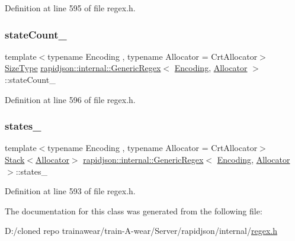 Definition at line 595 of file regex.\+h.

\mbox{\label{classrapidjson_1_1internal_1_1_generic_regex_a7155bb711773efe87437985ce9bd87e1}} 
\subsubsection{\texorpdfstring{stateCount\_}{stateCount\_}}
{\footnotesize\ttfamily template$<$typename Encoding , typename Allocator  = Crt\+Allocator$>$ \\
\mbox{\hyperlink{namespacerapidjson_a44eb33eaa523e36d466b1ced64b85c84}{Size\+Type}} \mbox{\hyperlink{classrapidjson_1_1internal_1_1_generic_regex}{rapidjson\+::internal\+::\+Generic\+Regex}}$<$ \mbox{\hyperlink{classrapidjson_1_1_encoding}{Encoding}}, \mbox{\hyperlink{classrapidjson_1_1_allocator}{Allocator}} $>$\+::state\+Count\+\_\+\hspace{0.3cm}{\ttfamily [private]}}



Definition at line 596 of file regex.\+h.

\mbox{\label{classrapidjson_1_1internal_1_1_generic_regex_aa50e1415cbd35b4029f3a7adb3adff0a}} 
\subsubsection{\texorpdfstring{states\_}{states\_}}
{\footnotesize\ttfamily template$<$typename Encoding , typename Allocator  = Crt\+Allocator$>$ \\
\mbox{\hyperlink{classrapidjson_1_1internal_1_1_stack}{Stack}}$<$\mbox{\hyperlink{classrapidjson_1_1_allocator}{Allocator}}$>$ \mbox{\hyperlink{classrapidjson_1_1internal_1_1_generic_regex}{rapidjson\+::internal\+::\+Generic\+Regex}}$<$ \mbox{\hyperlink{classrapidjson_1_1_encoding}{Encoding}}, \mbox{\hyperlink{classrapidjson_1_1_allocator}{Allocator}} $>$\+::states\+\_\+\hspace{0.3cm}{\ttfamily [private]}}



Definition at line 593 of file regex.\+h.



The documentation for this class was generated from the following file\+:\begin{DoxyCompactItemize}
\item 
D\+:/cloned repo trainawear/train-\/\+A-\/wear/\+Server/rapidjson/internal/\mbox{\hyperlink{regex_8h}{regex.\+h}}\end{DoxyCompactItemize}
